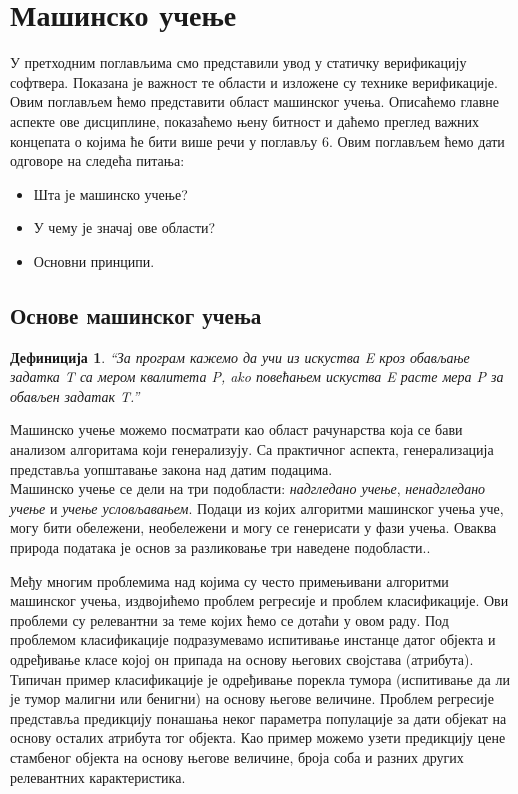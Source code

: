 \documentclass[a4paper]{article}
\newtheorem{definic}{Дефиниција}
\begin{document}
{\section{Машинско учење}
У претходним поглављима смо представили увод у статичку верификацију софтвера. Показана је важност те области и изложене су технике верификације. Овим поглављем ћемо представити област машинског учења. Описаћемо главне аспекте ове дисциплине, показаћемо њену битност и даћемо преглед важних концепата о којима ће бити више речи у поглављу 6.
Овим поглављем ћемо дати одговоре на следећа питања:
\begin{itemize}
\item Шта је машинско учење?
\item У чему је значај ове области?
\item Основни принципи.
\end{itemize}

\subsection{Основе машинског учења}
\begin{definic}
``За програм кажемо да учи из искуства E кроз обављање задатка T са мером квалитета P, ako повећањем искуства E расте мера P за обављен задатак T.''
\\[5pt]
\end{definic}
Машинско учење можемо посматрати као област рачунарства која се бави анализом алгоритама који генерализују. Са практичног аспекта, генерализација представља уопштавање закона над датим подацима. \\
Машинско учење се дели на три подобласти: \textit{надгледано учење}, \textit{ненадгледано учење} и \textit{учење условљавањем}. Подаци из којих алгоритми машинског учења уче, могу бити обележени, необележени и могу се генерисати у фази учења. Оваква природа података је основ за разликовање три наведене подобласти.\cite{tom-ml}.


Међу многим проблемима над којима су често примењивани алгоритми машинског учења, издвојићемо проблем регресије и проблем класификације. Ови проблеми су релевантни за теме којих ћемо се дотаћи у овом раду. Под проблемом класификације подразумевамо испитивање инстанце датог објекта и одређивање класе којој он припада на основу његових својстава (атрибута). Типичан пример класификације је одређивање порекла тумора (испитивање да ли је тумор малигни или бенигни) на основу његове величине. Проблем регресије представља предикцију понашања неког параметра популације за дати објекат на основу осталих атрибута тог објекта. Као пример можемо узети предикцију цене стамбеног објекта на основу његове величине, броја соба и разних других релевантних карактеристика.

}
\end{document}
